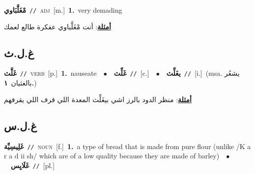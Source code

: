 \documentclass[10pt,a4paper,twoside]{article} %
\begin{document}
\begin{multicols}{2}
{\setlength\topsep{0pt}\textbf{\foreignlanguage{arabic}{مْغَلَّبَاوي}}\ {\color{gray}\texttt{//}\color{black}}\ \textsc{adj}\ [m.]\ \textbf{1.}~very demading\  \begin{flushright}\color{gray}\foreignlanguage{arabic}{\textbf{\underline{\foreignlanguage{arabic}{أمثلة}}}: أنت مْغَلَّباوي عفكرة طالع لعمك}\end{flushright}\color{black}} \vspace{2mm}

\vspace{-3mm}
\subsection*{\color{blue}\foreignlanguage{arabic}{غ.ل.ث}\color{blue}{}} 

{\setlength\topsep{0pt}\textbf{\foreignlanguage{arabic}{غَلَّث}}\ {\color{gray}\texttt{//}\color{black}}\ \textsc{verb}\ [p.]\ \textbf{1.}~nauseate\ \ $\bullet$\ \ \setlength\topsep{0pt}\textbf{\foreignlanguage{arabic}{غَلِّث}}\ {\color{gray}\texttt{//}\color{black}}\ [c.]\ \ $\bullet$\ \ \setlength\topsep{0pt}\textbf{\foreignlanguage{arabic}{يغَلِّث}}\ {\color{gray}\texttt{//}\color{black}}\ [i.]\ \color{gray}(msa. \foreignlanguage{arabic}{يشعُر بالغثيان}~\foreignlanguage{arabic}{\textbf{١.}})\color{black}\  \begin{flushright}\color{gray}\foreignlanguage{arabic}{\textbf{\underline{\foreignlanguage{arabic}{أمثلة}}}: منظر الدود بالرز اشي بيغَلِّث المعدة اللي قرف اللي يقرفهم}\end{flushright}\color{black}} \vspace{2mm}

\vspace{-3mm}
\subsection*{\color{blue}\foreignlanguage{arabic}{غ.ل.س}\color{blue}{}} 

{\setlength\topsep{0pt}\textbf{\foreignlanguage{arabic}{غَلِيسِيِّة}}\ {\color{gray}\texttt{//}\color{black}}\ \textsc{noun}\ [f.]\ \textbf{1.}~a type of bread that is made from pure flour (unlike /K a r a d ii sh/ which are of a low quality because they are made of barley)\ \ $\bullet$\ \ \setlength\topsep{0pt}\textbf{\foreignlanguage{arabic}{غَلَايِس}}\ {\color{gray}\texttt{//}\color{black}}\ [pl.]\ } \vspace{2mm}


\end{multicols}
\end{document}
